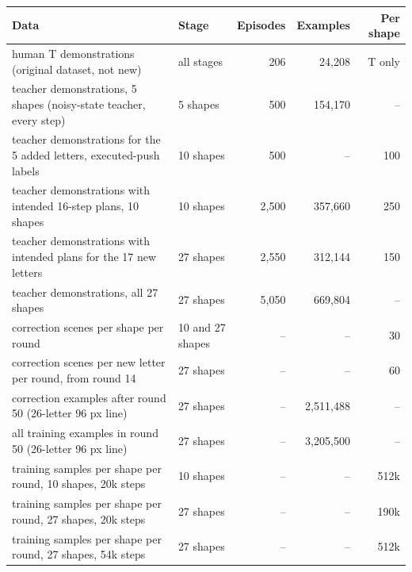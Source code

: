 
\begin{tabular}{p{6.4cm}lrrr}
\toprule
Data & Stage & Episodes & Examples & Per shape \\
\midrule
human T demonstrations (original dataset, not new) & all stages & 206 & 24,208 & T only \\
teacher demonstrations, 5 shapes (noisy-state teacher, every step) & 5 shapes & 500 & 154,170 & -- \\
teacher demonstrations for the 5 added letters, executed-push labels & 10 shapes & 500 & -- & 100 \\
teacher demonstrations with intended 16-step plans, 10 shapes & 10 shapes & 2,500 & 357,660 & 250 \\
teacher demonstrations with intended plans for the 17 new letters & 27 shapes & 2,550 & 312,144 & 150 \\
teacher demonstrations, all 27 shapes & 27 shapes & 5,050 & 669,804 & -- \\
correction scenes per shape per round & 10 and 27 shapes & -- & -- & 30 \\
correction scenes per new letter per round, from round 14 & 27 shapes & -- & -- & 60 \\
correction examples after round 50 (26-letter 96 px line) & 27 shapes & -- & 2,511,488 & -- \\
all training examples in round 50 (26-letter 96 px line) & 27 shapes & -- & 3,205,500 & -- \\
training samples per shape per round, 10 shapes, 20k steps & 10 shapes & -- & -- & 512k \\
training samples per shape per round, 27 shapes, 20k steps & 27 shapes & -- & -- & 190k \\
training samples per shape per round, 27 shapes, 54k steps & 27 shapes & -- & -- & 512k \\
\bottomrule
\end{tabular}
